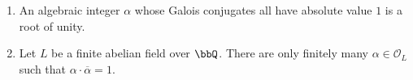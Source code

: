 \begin{lemma} \label{lemma:finitely_many_norm_1_elements_in_finite_abelian_number_field}
    \begin{enumerate}
        \item An algebraic integer $\alpha$ whose Galois conjugates all have absolute value $1$ is a root of unity.
        \item Let $L$ be a finite abelian field over $\bbQ$. There are only finitely many $\alpha \in \mathcal{O}_L$ such that $\alpha \cdot \overline{\alpha} = 1$.
    \end{enumerate}
\end{lemma}